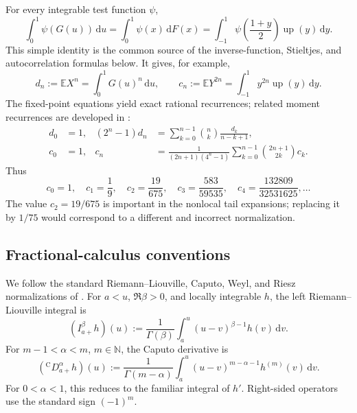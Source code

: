 \documentclass[11pt,oneside]{article}
\theoremstyle{definition}
\theoremstyle{remark}
\newcommand{\N}{\mathbb N}
\newcommand{\E}{\mathbb E}
\newcommand{\Up}{\operatorname{up}}
\newcommand{\dd}{\,\mathrm d}
\newcommand{\Caputo}{\mathrm C}
\begin{document}
For every integrable test function $\psi$,
\begin{equation}
 \int_0^1\psi(G(u))\dd u
 =\int_0^1\psi(x)\dd F(x)
 =\int_{-1}^{1}\psi\!\left(\frac{1+y}{2}\right)\Up(y)\dd y.
 \label{eq:three-way-dictionary}
\end{equation}
This simple identity is the common source of the inverse-function,
Stieltjes, and autocorrelation formulas below.  It gives, for example,
\begin{equation}
 d_n:=\E X^n=\int_0^1G(u)^n\dd u,
 \qquad
 c_n:=\E Y^{2n}=\int_{-1}^{1}y^{2n}\Up(y)\dd y.
\end{equation}
The fixed-point equations yield exact rational recurrences; related moment
recurrences are developed in \cite{arias1982,Have}:
\begin{align}
 d_0&=1,
 &
 (2^n-1)d_n
 &=\sum_{k=0}^{n-1}\binom nk\frac{d_k}{n-k+1},
 \label{eq:d-moment-recurrence}\\
 c_0&=1,
 &
 c_n
 &=\frac{1}{(2n+1)(4^n-1)}
   \sum_{k=0}^{n-1}\binom{2n+1}{2k}c_k.
 \label{eq:c-moment-recurrence}
\end{align}
Thus
\begin{equation}
 c_0=1,
 \quad c_1=\frac19,
 \quad c_2=\frac{19}{675},
 \quad c_3=\frac{583}{59535},
 \quad c_4=\frac{132809}{32531625},\ldots
 \label{eq:first-c-moments}
\end{equation}
The value $c_2=19/675$ is important in the nonlocal tail expansions; replacing
it by $1/75$ would correspond to a different and incorrect normalization.

\subsection{Fractional-calculus conventions}

We follow the standard Riemann--Liouville, Caputo, Weyl, and Riesz
normalizations of \cite{Caputo1967,Samko,Kilbas}.  For $a<u$,
$\Re\beta>0$, and locally integrable $h$, the left
Riemann--Liouville integral is
\begin{equation}
 (I_{a+}^{\beta}h)(u)
 :=\frac1{\Gamma(\beta)}
   \int_a^u(u-v)^{\beta-1}h(v)\dd v.
 \label{eq:RL-def}
\end{equation}
For $m-1<\alpha<m$, $m\in\N$, the Caputo derivative is
\begin{equation}
 ({}^{\Caputo}D_{a+}^{\alpha}h)(u)
 :=\frac1{\Gamma(m-\alpha)}
   \int_a^u(u-v)^{m-\alpha-1}h^{(m)}(v)\dd v.
 \label{eq:Caputo-def}
\end{equation}
For $0<\alpha<1$, this reduces to the familiar integral of $h'$.  Right-sided
operators use the standard sign $(-1)^m$.
\end{document}
